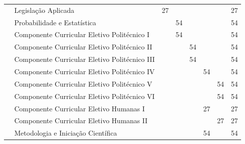 \documentclass[11pt,fleqn]{book} %
\begin{document}
\begin{table}[]
{\begin{tabular}{|l|l|c|c|c|c|c|c|}
				& Legislação Aplicada                           & 27                   &                      &                      &                      &                      & 27            \\ \cline{2-8} 
				& Probabilidade e Estatística                   &                      & 54                   &                      &                      &                      & 54            \\ \cline{2-8} 
				& Componente Curricular Eletivo Politécnico I   &                      & 54                   &                      &                      &                      & 54            \\ \cline{2-8} 
				& Componente Curricular Eletivo Politécnico II  &                      &                      & 54                   &                      &                      & 54            \\ \cline{2-8} 
				& Componente Curricular Eletivo Politécnico III &                      &                      & 54                   &                      &                      & 54            \\ \cline{2-8} 
				& Componente Curricular Eletivo Politécnico IV  &                      &                      &                      & 54                   &                      & 54            \\ \cline{2-8} 
				& Componente Curricular Eletivo Politécnico V   &                      &                      &                      &                      & 54                   & 54            \\ \cline{2-8} 
				& Componente Curricular Eletivo Politécnico VI  &                      &                      &                      &                      & 54                   & 54            \\ \cline{2-8} 
				& Componente Curricular Eletivo Humanas I       &                      &                      &                      & 27                   &                      & 27            \\ \cline{2-8} 
				& Componente Curricular Eletivo Humanas II      &                      &                      &                      &                      & 27                   & 27            \\ \cline{2-8} 
				& Metodologia e Iniciação Científica            &                      &                      &                      & 54                   &                      & 54            \\ \cline{2-8} 

\end{tabular}}
\end{table}
\end{document}
